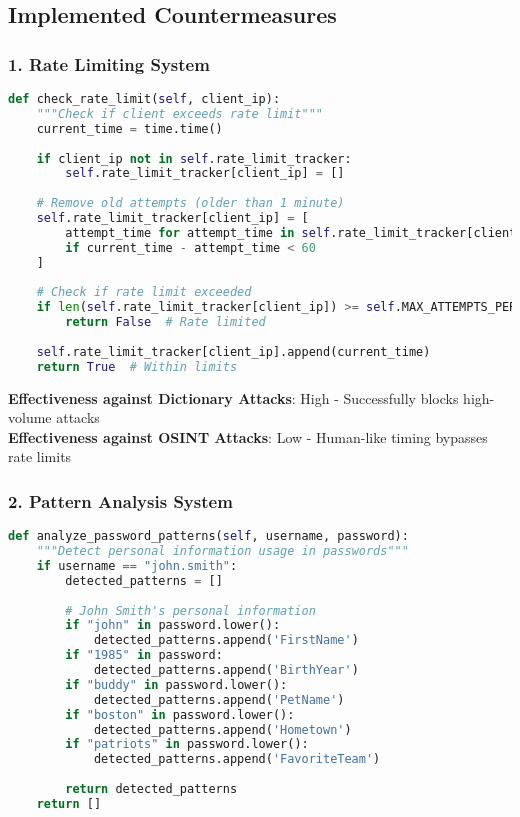 \documentclass[12pt,a4paper]{article}
\begin{document}
\subsection{Implemented Countermeasures}

\subsubsection{1. Rate Limiting System}

\begin{lstlisting}[language=Python, caption=Rate Limiting Implementation]
def check_rate_limit(self, client_ip):
    """Check if client exceeds rate limit"""
    current_time = time.time()
    
    if client_ip not in self.rate_limit_tracker:
        self.rate_limit_tracker[client_ip] = []
    
    # Remove old attempts (older than 1 minute)
    self.rate_limit_tracker[client_ip] = [
        attempt_time for attempt_time in self.rate_limit_tracker[client_ip]
        if current_time - attempt_time < 60
    ]
    
    # Check if rate limit exceeded
    if len(self.rate_limit_tracker[client_ip]) >= self.MAX_ATTEMPTS_PER_MINUTE:
        return False  # Rate limited
    
    self.rate_limit_tracker[client_ip].append(current_time)
    return True  # Within limits
\end{lstlisting}

\textbf{Effectiveness against Dictionary Attacks}: High - Successfully blocks high-volume attacks\\
\textbf{Effectiveness against OSINT Attacks}: Low - Human-like timing bypasses rate limits

\subsubsection{2. Pattern Analysis System}

\begin{lstlisting}[language=Python, caption=Pattern Detection Implementation]
def analyze_password_patterns(self, username, password):
    """Detect personal information usage in passwords"""
    if username == "john.smith":
        detected_patterns = []
        
        # John Smith's personal information
        if "john" in password.lower():
            detected_patterns.append('FirstName')
        if "1985" in password:
            detected_patterns.append('BirthYear')
        if "buddy" in password.lower():
            detected_patterns.append('PetName')
        if "boston" in password.lower():
            detected_patterns.append('Hometown')
        if "patriots" in password.lower():
            detected_patterns.append('FavoriteTeam')
        
        return detected_patterns
    return []
\end{lstlisting}
\end{document}
